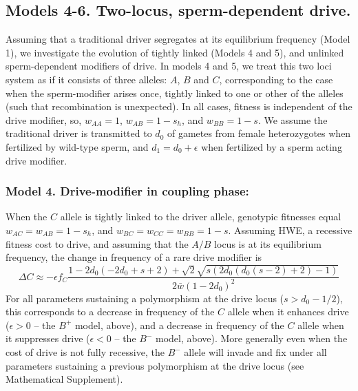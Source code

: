 \documentclass[12pt,letterpaper]{article}
\newcommand{\gc}[1]{{ \color{red} #1}}
\newcommand{\yb}[1]{{ \color{blue} #1}}
\begin{document}
\subsection*{Models 4-6. Two-locus, sperm-dependent drive.} 
Assuming that a traditional driver segregates at its equilibrium frequency (Model 1), we investigate the evolution of tightly linked (Models 4 and 5), and unlinked sperm-dependent modifiers of drive. 
In models 4 and 5, we treat this two loci system as if it consists of
three alleles: $A$, $B$ and $C$, corresponding to the case \gc{when the
sperm-modifier arises once, tightly linked to one or other of the
alleles (such that recombination is unexpected). }
In all cases, fitness is independent of the drive modifier, so, $w_{AA}=1$, $w_{AB}=1-s_h$, and $w_{BB} = 1-s$. 
We assume the traditional driver is transmitted to $d_0$ of gametes from female heterozygotes  when fertilized by wild-type sperm, and $d_1=d_0+\epsilon$ when fertilized by a sperm acting drive modifier.

\subsubsection*{Model 4. Drive-modifier in coupling phase:}
When the $C$ allele is tightly linked to the driver allele, 
	genotypic fitnesses equal $w_{AC}=w_{AB}=1-s_h$, and $w_{BC}=w_{CC}=w_{BB}=1-s$. 
Assuming HWE, a recessive fitness cost to drive, and assuming that the $A/B$ locus is at its equilibrium frequency, the change in frequency of a rare drive modifier is
\begin{equation}
	\Delta C\approx -\epsilon f_C \frac{ 1-2 d_0 (-2 d_0+s+2)+\sqrt{2} \sqrt{s (2 d_0 (d_0(s-2)+2)-1)}}{2 \bar{w}(1-2 d_0)^2}
\end{equation}
For all parameters sustaining a polymorphism at the drive locus ($s>d_0-1/2$), this corresponds to a decrease in frequency of the $C$ allele when it enhances drive ($\epsilon >0$ -- the $B^+$ model, above), 
	and a decrease in frequency of the $C$ allele when it suppresses drive ($\epsilon <0$ -- the $B^-$ model, above). 
More generally even when the cost of drive is not fully recessive, the $B^-$ allele will invade and fix under all parameters sustaining a previous polymorphism at the drive locus (see Mathematical Supplement). 
\end{document}

